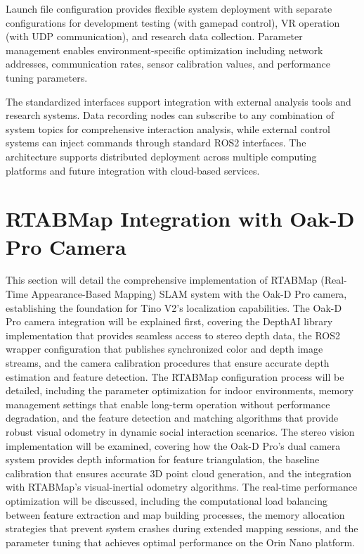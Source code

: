 Launch file configuration provides flexible system deployment with separate configurations for development testing (with gamepad control), VR operation (with UDP communication), and research data collection. Parameter management enables environment-specific optimization including network addresses, communication rates, sensor calibration values, and performance tuning parameters.

The standardized interfaces support integration with external analysis tools and research systems. Data recording nodes can subscribe to any combination of system topics for comprehensive interaction analysis, while external control systems can inject commands through standard ROS2 interfaces. The architecture supports distributed deployment across multiple computing platforms and future integration with cloud-based services.

\section{RTABMap Integration with Oak-D Pro Camera}
This section will detail the comprehensive implementation of RTABMap (Real-Time Appearance-Based Mapping) SLAM system with the Oak-D Pro camera, establishing the foundation for Tino V2's localization capabilities. The Oak-D Pro camera integration will be explained first, covering the DepthAI library implementation that provides seamless access to stereo depth data, the ROS2 wrapper configuration that publishes synchronized color and depth image streams, and the camera calibration procedures that ensure accurate depth estimation and feature detection. The RTABMap configuration process will be detailed, including the parameter optimization for indoor environments, memory management settings that enable long-term operation without performance degradation, and the feature detection and matching algorithms that provide robust visual odometry in dynamic social interaction scenarios. The stereo vision implementation will be examined, covering how the Oak-D Pro's dual camera system provides depth information for feature triangulation, the baseline calibration that ensures accurate 3D point cloud generation, and the integration with RTABMap's visual-inertial odometry algorithms. The real-time performance optimization will be discussed, including the computational load balancing between feature extraction and map building processes, the memory allocation strategies that prevent system crashes during extended mapping sessions, and the parameter tuning that achieves optimal performance on the Orin Nano platform.

